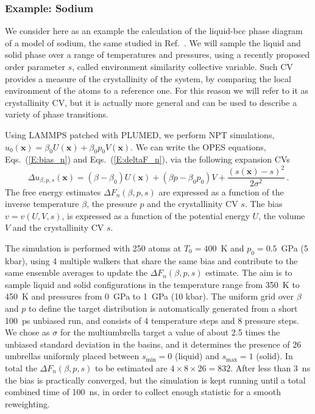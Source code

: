 \documentclass[aps,prx,reprint,superscriptaddress]{revtex4-1} %
\begin{document}
\subsubsection*{Example: Sodium}
We consider here as an example the calculation of the liquid-bcc phase diagram of a model of sodium\cite{Mendelev2015}, the same studied in Ref.~.
We will sample the liquid and solid phase over a range of temperatures and pressures, using a recently proposed order parameter $s$, called environment similarity collective variable\cite{Piaggi2019cv}.
Such CV provides a measure of the crystallinity of the system, by comparing the local environment of the atoms to a reference one.
For this reason we will refer to it as crystallinity CV, but it is actually more general and can be used to describe a variety of phase transitions\cite{Niu2020,Piaggi2020}.

Using LAMMPS patched with PLUMED, we perform NPT simulations, $u_0(\mathbf{x})=\beta_0 U(\mathbf{x})+\beta_0 p_0 V(\mathbf{x})$.
We can write the OPES equations, Eqs.~(\ref{E:bias_n}) and Eqs.~(\ref{E:deltaF_n}), via the following expansion CVs
\begin{equation}
    \Delta u_{\beta,p,s}(\mathbf{x})=(\beta-\beta_0)U(\mathbf{x})+(\beta p-\beta_0 p_0)V+\frac{(s(\mathbf{x})-s)^2}{2\sigma^2}\, .
\end{equation}
The free energy estimates $\Delta F_n(\beta,p,s)$ are expressed as a function of the inverse temperature $\beta$, the pressure $p$ and the crystallinity CV $s$.
The bias $v=v(U,V,s)$, is expressed as a function of the potential energy $U$, the volume $V$ and the crystallinity CV $s$.

The simulation is performed with 250 atoms at $T_0=400$~K and $p_0=0.5$~GPa (5 kbar), using 4 multiple walkers that share the same bias and contribute to the same ensemble averages to update the $\Delta F_n(\beta,p,s)$ estimate.
The aim is to sample liquid and solid configurations in the temperature range from 350~K to 450~K and pressures from 0~GPa to 1~GPa (10 kbar).
The uniform grid over $\beta$ and $p$ to define the target distribution is automatically generated from a short 100~ps unbiased run, and consists of 4 temperature steps and 8 pressure steps.
We chose as $\sigma$ for the multiumbrella target a value of about 2.5 times the unbiased standard deviation in the basins, and it determines the presence of 26 umbrellas uniformly placed between $s_{\min}=0$ (liquid) and $s_{\max}=1$ (solid).
In total the $\Delta F_n(\beta,p,s)$ to be estimated are $4\times8\times26=832$.
After less than 3~ns the bias is practically converged, but the simulation is kept running until a total combined time of 100~ns, in order to collect enough statistic for a smooth reweighting.
\end{document}
